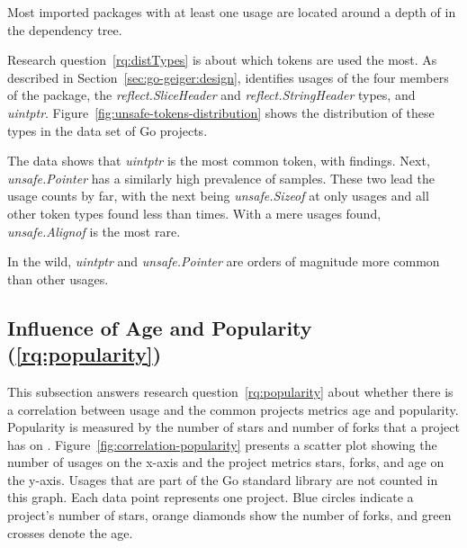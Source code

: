 \begin{answerToRQ}[\ref{rq:depsDepth}]
    Most imported packages with at least one \unsafe{} usage are located around a depth of
    \averageUnsafeImportDepthRounded{} in the dependency tree.
\end{answerToRQ}

Research question~\ref{rq:distTypes} is about which \unsafe{} tokens are used the most.
As described in Section~\ref{sec:go-geiger:design}, \toolGeiger{} identifies usages of the four members of the \unsafe{}
package, the \textit{reflect.SliceHeader} and \textit{reflect.StringHeader} types, and \textit{uintptr}.
Figure~\ref{fig:unsafe-tokens-distribution} shows the distribution of these \unsafe{} types in the data set of Go
projects.



The data shows that \textit{uintptr} is the most common \unsafe{} token, with  findings.
Next, \textit{unsafe.Pointer} has a similarly high prevalence of  samples.
These two lead the usage counts by far, with the next being \textit{unsafe.Sizeof} at only  usages and
all other token types found less than  times.
With a mere  usages found, \textit{unsafe.Alignof} is the most rare.


\begin{answerToRQ}[\ref{rq:distTypes}]
    In the wild, \textit{uintptr} and \textit{unsafe.Pointer} are orders of magnitude more common than other \unsafe{}
    usages.
\end{answerToRQ}



\subsection{Influence of Age and Popularity (\ref{rq:popularity})}\label{subsec:go-geiger:evaluation:popularity}

This subsection answers research question~\ref{rq:popularity} about whether there is a correlation between \unsafe{}
usage and the common projects metrics age and popularity.
Popularity is measured by the number of stars and number of forks that a project has on \github{}.
Figure~\ref{fig:correlation-popularity} presents a scatter plot showing the number of \unsafe{} usages on the x-axis and
the project metrics stars, forks, and age on the y-axis.
Usages that are part of the Go standard library are not counted in this graph.
Each data point represents one project.
Blue circles indicate a project's number of stars, orange diamonds show the number of forks, and green crosses denote
the age.

